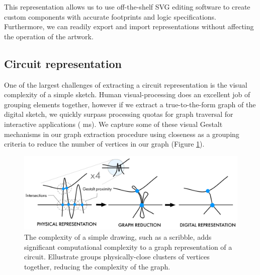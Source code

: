 \documentclass{sigchi}
\begin{document}
    This representation allows us to use off-the-shelf SVG editing software to create custom components with accurate footprints and logic specifications. Furthermore, we can readily export and import representations without affecting the operation of the artwork.

    \subsection{Circuit representation}
      One of the largest challenges of extracting a circuit representation is the visual complexity of a simple sketch. Human visual-processing does an excellent job of grouping elements together, however if we extract a true-to-the-form graph of the digital sketch, we quickly surpass processing quotas for graph traversal for interactive applications ( ms). We capture some of these visual Gestalt mechanisms in our graph extraction procedure using closeness as a grouping criteria to reduce the number of vertices in our graph (Figure \ref{fig:gestalt}). 

      \begin{figure}[t]
        \centering
        \includegraphics[width=1.0\columnwidth]{figures/gestalt.pdf}
        \caption{The complexity of a simple drawing, such as a scribble, adds significant computational complexity to a graph representation of a circuit. Ellustrate groups physically-close clusters of vertices together, reducing the complexity of the graph. }
        \label{fig:gestalt}
        \vspace{-20pt}
      \end{figure}
\end{document}
